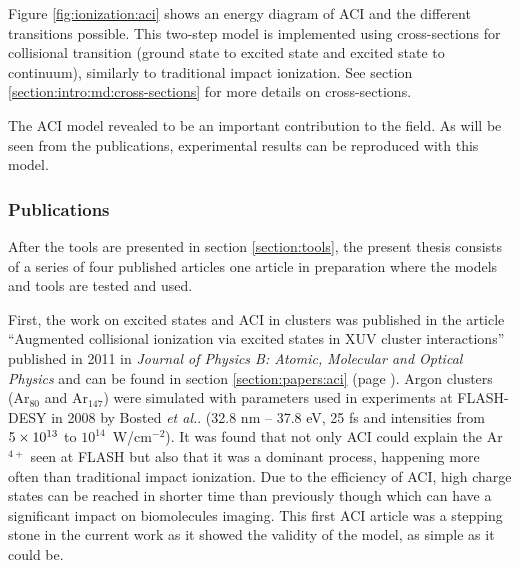 Figure \ref{fig:ionization:aci} shows an energy diagram of ACI and the
different transitions possible. This two-step model is implemented using
cross-sections for collisional transition (ground state to excited state and
excited state to continuum), similarly to traditional impact
ionization. See section \ref{section:intro:md:cross-sections} for more
details on cross-sections.

The ACI model revealed to be an important contribution to the field. As will be
seen from the publications, experimental results can be reproduced with this
model.



\subsubsection{Publications}

After the tools are presented in section \ref{section:tools}, the present thesis
consists of a series of %
four published articles
one article in preparation
where the models
and tools are tested and used.



First, the work on excited states and ACI in clusters was published in the article
``Augmented collisional ionization via excited states in XUV cluster
interactions'' published in 2011 in \textit{Journal of Physics B: Atomic,
Molecular and Optical Physics}\cite{Ackad2011a} and can be found in section
\ref{section:papers:aci} (page \pageref{section:papers:aci}). Argon clusters
(Ar$_{80}$ and Ar$_{147}$) were simulated with parameters used in experiments
at FLASH-DESY in 2008 by Bosted \textit{et al.}\cite{Bostedt2008}.
(32.8 nm -- 37.8 eV, 25 fs and intensities from $\ten{5}{13}$ to
$10^{14}$~W/cm$^{-2}$). It was found that not only ACI could explain the
Ar$^{4+}$ seen at FLASH but also that it
was a dominant process, happening more often than traditional impact ionization.
Due to the efficiency of ACI, high charge states can be reached in shorter time
than previously though which can have a significant impact on biomolecules
imaging. This first ACI article was a stepping stone in the current work as it
showed the validity of the model, as simple as it could be.



